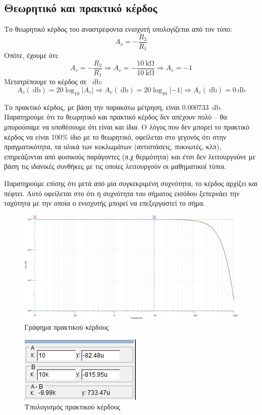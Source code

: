 \documentclass[12pt]{article}
\begin{document}
\subsection{Θεωρητικό και πρακτικό κέρδος}

Το θεωρητικό κέρδος του αναστρέφοντα ενισχυτή υπολογίζεται από τον τύπο:
\[A_v = -\frac{R_2}{R_1}\]
Οπότε, έχουμε ότι:
\[
	A_v = -\frac{R_2}{R_1} \Rightarrow
	A_v = -\frac{\SI{10}{\kilo\ohm}}{\SI{10}{\kilo\ohm}} \Rightarrow
	A_v = -1
\]
Μετατρέπουμε το κέρδος σε \SI{}{\decibel}:
\[
	A_v(\SI{}{\decibel}) = 20\log_{10}\lvert A_v \lvert \Rightarrow
	A_v(\SI{}{\decibel}) = 20\log_{10}\lvert -1 \lvert \Rightarrow
	A_v(\SI{}{\decibel}) = \SI{0}{\decibel}
\]

Το πρακτικό κέρδος, με βάση την παρακάτω μέτρηση, είναι
\SI{0.000733}{\decibel}. Παρατηρούμε ότι το θεωρητικό και πρακτικό κέρδος δεν
απέχουν πολύ -- θα μπορούσαμε να υποθέσουμε ότι είναι και ίδια. Ο λόγος που δεν
μπορεί το πρακτικό κέρδος να είναι 100\% ίδιο με το θεωρητικό, οφείλεται στο
γεγονός ότι στην πραγματικότητα, τα υλικά των κυκλωμάτων (αντιστάσεις,
πυκνωτές, κλπ), επηρεάζονται από φυσικούς παράγοντες (π.χ θερμότητα) και έτσι
δεν λειτουργούνε με βάση τις ιδανικές συνθήκες με τις οποίες λειτουργούν οι
μαθηματικοί τύποι.

Παρατηρούμε επίσης ότι μετά από μία συγκεκριμένη συχνότητα, το κέρδος αρχίζει
και πέφτει. Αυτό οφείλεται στο ότι η συχνότητα του σήματος εισόδου ξεπερνάει
την ταχύτητα με την οποία ο ενισχυτής μπορεί να επεξεργαστεί το σήμα.

\begin{figure}[H]
	\centering
	\includegraphics[width=\linewidth]{./res/gain.jpg}
	\caption{Γράφημα πρακτικού κέρδους}
\end{figure}
\begin{figure}[H]
	\centering
	\includegraphics{./res/gaincalc.jpg}
	\caption{Υπολογισμός πρακτικού κέρδους}
\end{figure}
\end{document}
